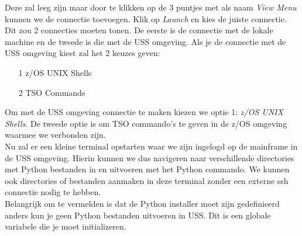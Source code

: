 Deze zal leeg zijn maar door te klikken op de 3 puntjes met als naam \textit{View Menu} kunnen we de connectie toevoegen. Klik op \textit{Launch} en kies de juiste connectie. Dit zou 2 connecties moeten tonen. De eerste is de connectie met de lokale machine en de tweede is die met de USS omgeving. Als je de connectie met de USS omgeving kiest zal het 2 keuzes geven:

\begin{itemize}
    \item[1] z/OS UNIX Shells
    \item[2] TSO Commands
\end{itemize}

Om met de USS omgeving connectie te maken kiezen we optie 1: \textit{z/OS UNIX Shells}. De tweede optie is om TSO commando's te geven in de z/OS omgeving waarmee we verbonden zijn. \\

Nu zal er een kleine terminal opstarten waar we zijn ingelogd op de mainframe in de USS omgeving. Hierin kunnen we dus navigeren naar verschillende directories met Python bestanden in en uitvoeren met het Python commando. We kunnen ook directories of bestanden aanmaken in deze terminal zonder een externe ssh connectie nodig te hebben. \\

Belangrijk om te vermelden is dat de Python installer moet zijn gedefinieerd anders kun je geen Python bestanden uitvoeren in USS. Dit is een globale variabele die je moet initializeren.